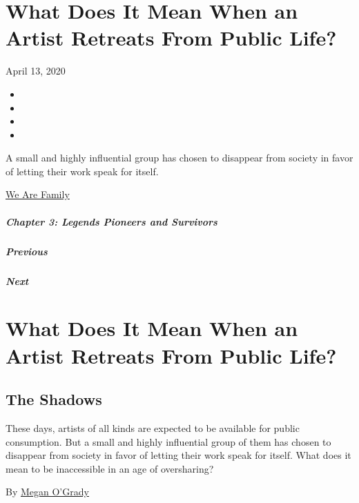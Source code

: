 \hypertarget{what-does-it-mean-when-an-artist-retreats-from-public-life}{%
\section{What Does It Mean When an Artist Retreats From Public
Life?}\label{what-does-it-mean-when-an-artist-retreats-from-public-life}}

April 13, 2020

\begin{itemize}
\item
\item
\item
\item
\end{itemize}

A small and highly influential group has chosen to disappear from
society in favor of letting their work speak for itself.

\href{https://www.nytimes.com/interactive/2020/04/13/t-magazine/culture-issue-2020.html}{We
Are Family}

\hypertarget{chapter-3-legends-pioneers-and-survivors}{%
\subparagraph{Chapter 3: Legends Pioneers and
Survivors}\label{chapter-3-legends-pioneers-and-survivors}}

\hypertarget{previous}{%
\subparagraph{Previous}\label{previous}}

\hypertarget{next}{%
\subparagraph{Next}\label{next}}

\hypertarget{what-does-it-mean-when-an-artist-retreats-from-public-life-1}{%
\section{What Does It Mean When an Artist Retreats From Public
Life?}\label{what-does-it-mean-when-an-artist-retreats-from-public-life-1}}

\hypertarget{the-shadows}{%
\subsection{The Shadows}\label{the-shadows}}

These days, artists of all kinds are expected to be available for public
consumption. But a small and highly influential group of them has chosen
to disappear from society in favor of letting their work speak for
itself. What does it mean to be inaccessible in an age of oversharing?

By \href{https://www.nytimes.com/by/megan-o-grady}{Megan O'Grady}

